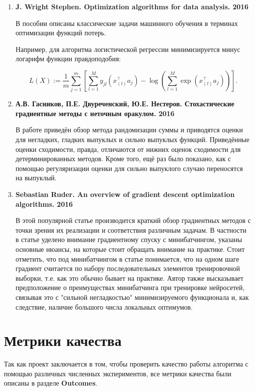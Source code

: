 \documentclass[]{scrartcl}
\begin{document}
\begin{enumerate}
	\item \textbf{J. Wright Stephen. Optimization algorithms for data analysis. 2016  \cite{wright2016}}
		
В пособии  описаны классические задачи машинного обучения в терминах оптимизации функций потерь.

Например, для алгоритма логистической регрессии минимизируется минус логарифм функции правдоподобия:

\begin{equation}
L(X) := \frac{1}{m}\sum\limits_{j=1}^m\left[\sum_{l=1}^M y_{jl}(x^{\top}_{(l)}a_j) - \log \left(\sum_{l=1}^M \exp(x^{\top}_{(l)}a_j)\right)  \right].
\end{equation}

	\item \textbf{А.В. Гасников, П.Е. Двуреченский, Ю.Е. Нестеров. Стохастические градиентные методы с неточным оракулом. 2016 \cite{gas2016stoch}}

В работе приведён обзор метода рандомизации суммы и приводятся оценки для негладких, гладких выпуклых и сильно выпуклых функций. Приведённые оценки сходимости, правда, отличаются от нижних оценок сходимости для детерминированных методов. Кроме того, ещё раз было  показано, как с помощью регуляризации оценки для сильно выпуклого случаю переносятся на выпуклый.

	\item \textbf{Sebastian Ruder. An overview of gradient descent optimization algorithms. 2016 \cite{ruder2016overview}}
	
В этой популярной статье производится краткий обзор градиентных методов с точки зрения их реализации и соответствия различным задачам. В частности в статье уделено внимание градиентному спуску с минибатчингом, указаны основные нюансы, на которые стоит обращать внимание на практике. Стоит отметить, что под минибатчингом в статье понимается, что на одном шаге градиент считается по набору последовательных элементов тренировочной выборки, т.е. как это обычно бывает на практике. Автор также высказывает предположение о преимуществах минибатчинга при тренировке нейросетей, связывая это с "сильной негладкостью" минимизируемого функционала и, как следствие, наличие большого числа локальных оптимумов.
  
 
\end{enumerate}

\section{Метрики качества}
Так как проект заключается в том, чтобы проверить качество работы алгоритма с помощью различных численных экспериментов, все метрики качества были описаны в разделе \textbf{Outcomes}.
\end{document}
